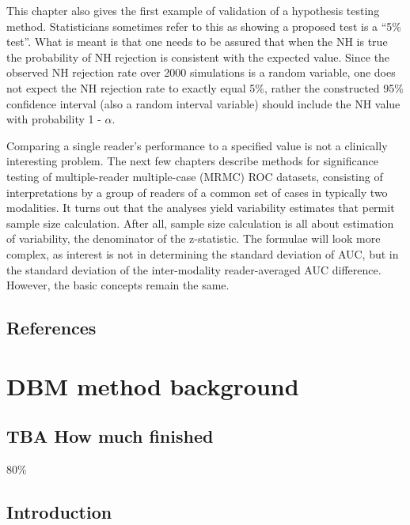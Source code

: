 \documentclass[
]{book}
\begin{document}
This chapter also gives the first example of validation of a hypothesis testing method. Statisticians sometimes refer to this as showing a proposed test is a ``5\% test''. What is meant is that one needs to be assured that when the NH is true the probability of NH rejection is consistent with the expected value. Since the observed NH rejection rate over 2000 simulations is a random variable, one does not expect the NH rejection rate to exactly equal 5\%, rather the constructed 95\% confidence interval (also a random interval variable) should include the NH value with probability 1 - \(\alpha\).

Comparing a single reader's performance to a specified value is not a clinically interesting problem. The next few chapters describe methods for significance testing of multiple-reader multiple-case (MRMC) ROC datasets, consisting of interpretations by a group of readers of a common set of cases in typically two modalities. It turns out that the analyses yield variability estimates that permit sample size calculation. After all, sample size calculation is all about estimation of variability, the denominator of the z-statistic. The formulae will look more complex, as interest is not in determining the standard deviation of AUC, but in the standard deviation of the inter-modality reader-averaged AUC difference. However, the basic concepts remain the same.

\hypertarget{hypothesis-testing-references}{%
\section{References}\label{hypothesis-testing-references}}

\hypertarget{dbm-analysis-background}{%
\chapter{DBM method background}\label{dbm-analysis-background}}

\hypertarget{dbm-analysis-background-how-much-finished}{%
\section{TBA How much finished}\label{dbm-analysis-background-how-much-finished}}

80\%

\hypertarget{dbm-analysis-background-introduction}{%
\section{Introduction}\label{dbm-analysis-background-introduction}}
\end{document}
